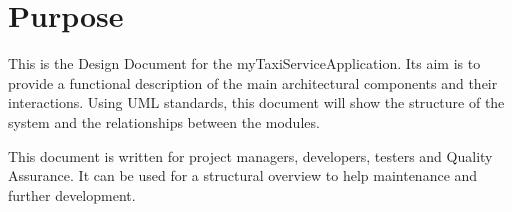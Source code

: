 \section{Purpose}
\label{sec:purpose}

This is the Design Document for the myTaxiServiceApplication. Its aim is to provide a functional description of the main architectural components and their interactions.
Using UML standards, this document will show the structure of the system and the relationships between the modules.

This document is written for project managers, developers, testers and Quality Assurance. It can be used for a structural overview to help maintenance and further development.
